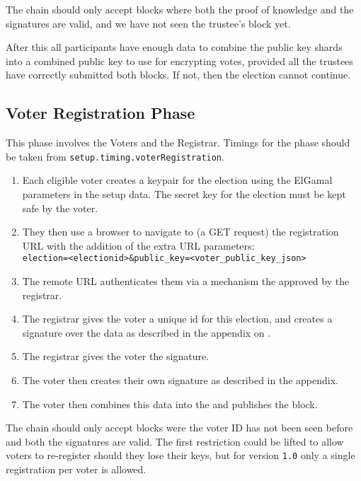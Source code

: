 The chain should only accept blocks where both the proof of knowledge and the signatures are valid, and we have not seen the trustee's block yet.

After this all participants have enough data to combine the public key shards into a combined public key to use for encrypting votes, provided all the trustees have correctly submitted both blocks. If not, then the election cannot continue.

\subsection{Voter Registration Phase}
\label{ch:astris:detail:registration}

This phase involves the Voters and the Registrar. Timings for the phase should be taken from \texttt{setup.timing.voterRegistration}.

\begin{enumerate}
    \item Each eligible voter creates a keypair for the election using the ElGamal parameters in the setup data. The secret key for the election must be kept safe by the voter.
    \item They then use a browser to navigate to (a GET request) the registration URL with the addition of the extra URL parameters:\\ \verb|election=<electionid>&public_key=<voter_public_key_json>|
    \item The remote URL authenticates them via a mechanism the approved by the registrar.
    \item The registrar gives the voter a unique id for this election, and creates a signature over the data as described in the appendix on .
    \item The registrar gives the voter the signature.
    \item The voter then creates their own signature as described in the appendix.
    \item The voter then combines this data into the  and publishes the block.
\end{enumerate}

The chain should only accept blocks were the voter ID has not been seen before and both the signatures are valid. The first restriction could be lifted to allow voters to re-register should they lose their keys, but for version \texttt{1.0} only a single registration per voter is allowed.

